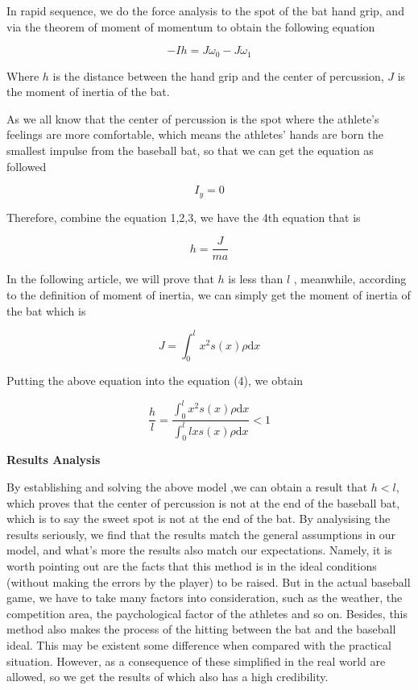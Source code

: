 In rapid sequence, we do the force analysis to the spot of the bat hand grip, and via the theorem of moment of momentum to obtain the following equation

\begin{equation}
-Ih=J\omega_0-J\omega_1
\end{equation}

Where $h$ is the distance between the hand grip and the center of percussion,
   $J$ is the moment of inertia of the bat.

As we all know that the center of percussion is the spot where the athlete's feelings are more comfortable, which means the athletes' hands are born the smallest impulse from the baseball bat, so that we can get the equation as followed

\begin{equation}
I_y=0
\end{equation}

Therefore, combine the equation 1,2,3, we have the 4th equation that is

\begin{equation}
h=\frac{J}{ma}
\end{equation}

In the following article, we will prove that $h$  is less than $l$ , meanwhile, according to the definition of moment of inertia, we can simply get the moment of inertia of the bat which is

\begin{equation}
J=\int_0^lx^2s(x)\rho\textrm{d}x
\end{equation}

Putting the above equation into the equation (4), we obtain

\[
\frac{h}{l}=\frac{\int_0^lx^2s(x)\rho\textrm{d}x}{\int_0^llxs(x)\rho\textrm{d}x}<1
\]


\textbf{Results Analysis}

By establishing and solving the above model ,we can obtain a result that $h<l$, which proves that the center of percussion is not at the end of the baseball bat, which is to say the sweet spot is not at the end of the bat. By analysising the results seriously, we find that the results match the general assumptions in our model, and what's more the results also match our expectations. Namely, it is worth pointing out are the facts that this method is in the ideal conditions (without making the errors by the player) to be raised. But in the actual baseball game, we have to take many factors into consideration, such as the weather, the competition area, the paychological factor of the athletes and so on. Besides, this method also makes the process of the hitting between the bat and the baseball ideal. This may be existent some difference when compared with the practical situation. However, as a consequence of these simplified in the real world are allowed, so we get the results of which also has a high credibility.



